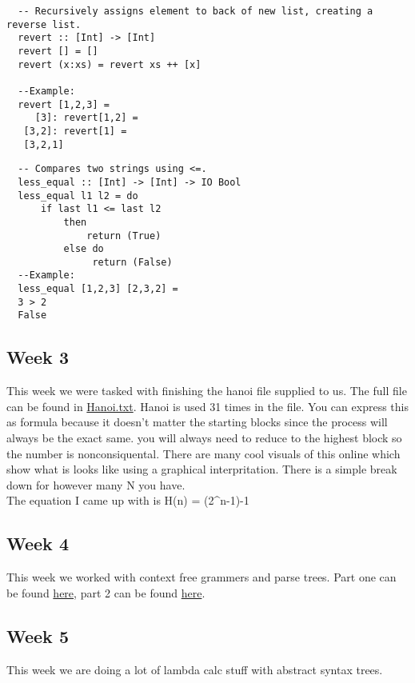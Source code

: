 \documentclass{article}
\theoremstyle{theorem}
\theoremstyle{definition}
\theoremstyle{remark}
\begin{document}
\begin{lstlisting}
  -- Recursively assigns element to back of new list, creating a reverse list.
  revert :: [Int] -> [Int]
  revert [] = []
  revert (x:xs) = revert xs ++ [x]

  --Example:
  revert [1,2,3] = 
     [3]: revert[1,2] =
   [3,2]: revert[1] =
   [3,2,1]
\end{lstlisting}
\begin{lstlisting}
  -- Compares two strings using <=.
  less_equal :: [Int] -> [Int] -> IO Bool
  less_equal l1 l2 = do
      if last l1 <= last l2
          then 
              return (True)
          else do
               return (False)
  --Example:
  less_equal [1,2,3] [2,3,2] = 
  3 > 2
  False
\end{lstlisting}

\subsection{Week 3}

This week we were tasked with finishing the hanoi file supplied to us. The full file can be found 
in \href {https://github.com/jacgoldberg/Programming-Lang/blob/main/Hanoi.txt}{Hanoi.txt}.
Hanoi is used 31 times in the file. 
You can express this as formula because it doesn't matter the starting blocks since the process will always be the exact same.
you will always need to reduce to the highest block so the number is nonconsiquental. There are many cool visuals of this online which show what is looks like using a graphical interpritation. There is a simple break down for however many N you have. 
\\ The equation I came up with is H(n) = (2^n-1)-1

\subsection{Week 4}
This week we worked with context free grammers and parse trees. Part one can be found \href {https://github.com/jacgoldberg/Programming-Lang/blob/main/Note%20Sep%2025%2C%202022.pdf}{here}, part 2 can be found 
\href {https://github.com/jacgoldberg/Programming-Lang/blob/main/Note%20Sep%2025%2C%202022%20(2).pdf} {here}. 

\subsection{Week 5}
This week we are doing a lot of lambda calc stuff with abstract syntax trees.
\end{document}
